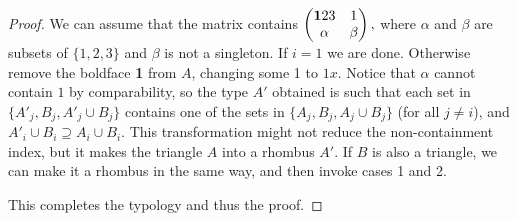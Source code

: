 \documentclass[11pt]{amsart}
\begin{document}
\begin{proof}
We can assume that the matrix contains
$\begin{pmatrix}
{\bf 1}23 & 1 \\
\alpha & \beta  
\end{pmatrix},$
where $\alpha$ and $\beta$ are subsets of $\{1,2,3\}$ and $\beta$ is not a singleton. If $i=1$ we are done. Otherwise remove the boldface {\bf 1} from $A$, changing some 1 to $1x$. Notice that $\alpha$ cannot contain $1$ by comparability, so the type $A'$ obtained is such that each set in $\{A'_j, B_j, A'_j \cup B_j\}$ contains one of the sets in $\{A_j,B_j,A_j \cup B_j\}$ (for all $j \neq i$), and $A'_i \cup B_i \supseteq A_i \cup B_i$. This transformation might not reduce the non-containment index, but it makes the triangle $A$ into a rhombus $A'$. If $B$ is also a triangle, we can make it a rhombus in the same way, and then invoke cases 1 and 2.

\medskip

This completes the typology and thus the proof.
\end{proof}





\end{document}
